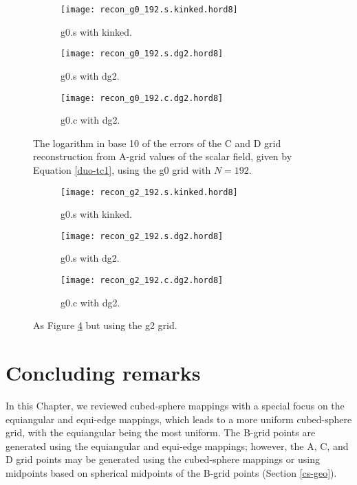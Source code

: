 \newpage
\begin{figure}[!ht]
	\centering
	\begin{subfigure}{0.9\textwidth}
		\centering
		\texttt{[image: recon\_g0\_192.s.kinked.hord8]}
		\caption{g0.s with kinked. \label{recon-errors-g0-s}}
	\end{subfigure}
	
	\begin{subfigure}{0.9\textwidth}
		\centering
		\texttt{[image: recon\_g0\_192.s.dg2.hord8]}
		\caption{g0.s with dg2.\label{recon-errors-g0-s-dg}}
	\end{subfigure}
	
	\begin{subfigure}{0.9\textwidth}
		\centering
		\texttt{[image: recon\_g0\_192.c.dg2.hord8]}
		\caption{g0.c with dg2.\label{recon-errors-g0-c-dg}}
	\end{subfigure}
	\caption{The logarithm in base 10 of the errors of the C and D grid reconstruction from A-grid values of the scalar field, 
		given by Equation \eqref{duo-tc1}, using the g0 grid with $N=192$. \label{recon-errors-g0}}
\end{figure}

\newpage
\begin{figure}[!ht]
	\centering
	\begin{subfigure}{0.9\textwidth}
		\centering
		\texttt{[image: recon\_g2\_192.s.kinked.hord8]}
		\caption{g0.s with kinked. \label{recon-errors-g2-s}}
	\end{subfigure}
	
	\begin{subfigure}{0.9\textwidth}
		\centering
		\texttt{[image: recon\_g2\_192.s.dg2.hord8]}
		\caption{g0.s with dg2.\label{recon-errors-g2-s-dg}}
	\end{subfigure}
	
	\begin{subfigure}{0.9\textwidth}
		\centering
		\texttt{[image: recon\_g2\_192.c.dg2.hord8]}
		\caption{g0.c with dg2.\label{recon-errors-g2-c-dg}}
	\end{subfigure}
	\caption{As Figure \ref{recon-errors-g0} but using the g2 grid. \label{recon-errors-g2}}
\end{figure}


\section{Concluding remarks}
\label{cs-conc}
In this Chapter, we reviewed cubed-sphere mappings with a special focus on the equiangular and equi-edge mappings,
which leads to a more uniform cubed-sphere grid, with the equiangular being the most uniform.
The B-grid points are generated using the equiangular and equi-edge mappings;
however, the A, C, and D grid points may be generated using the cubed-sphere mappings or using midpoints based on spherical midpoints of the B-grid points
(Section \ref{cs-geo}).


